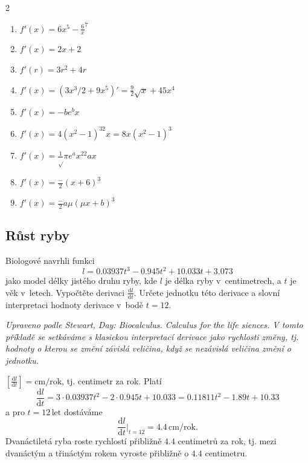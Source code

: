 \def\der#1.{$f'(x)=#1$}
\reseni
\begin{multicols}2
  \begin{enumerate}
  \item \der 6x^5-\frac{6}{x^7}.
  \item \der 2x+2.
  \item $f'(r)=3r^2+4r$
  \item \der (3x^{3/2}+9x^5)'=\frac 92\sqrt x+45x^4.
  \item \der -be^{bx}.
  \item \der 4(x^2-1)^32x=8x(x^2-1)^3.
  \item \der \frac 1{\sqrt \pi} e^{ax^2}2ax.
  \item \der \frac{-2}{(x+6)^3}.
  \item \der \frac{-2a\mu}{(\mu x+b)^3}.
  \end{enumerate}
\end{multicols}
\konec

\def\jednotka #1#2{\left[\frac{\mathrm{d}#1}{\mathrm{d}#2}\right]}
\def\derivace #1#2{\frac{\mathrm{d}#1}{\mathrm{d}#2}}


\stranka
{}
\subsection{Růst ryby}
Biologové navrhli funkci
  \begin{equation*}
    l=0.03937 t^3 - 0.945 t^2 + 10.033 t + 3.073
  \end{equation*}
  jako model délky jistého druhu ryby, kde $l$ je délka ryby v~centimetrech, a $t$ je věk v~letech.  Vypočtěte derivaci
  $\frac{\mathrm{d}l}{\mathrm {d}t}$. Určete jednotku této derivace a
  slovní interpretaci hodnoty derivace v~bodě $t=12$.

\textit{Upraveno podle Stewart, Day: Biocalculus. Calculus for the life siences. V tomto příkladě se setkáváme s klasickou interpretací derivace jako rychlosti změny, tj. hodnoty o kterou se změní závislá veličina, když se nezávislá veličina změní o jednotku.}

\reseni $\jednotka lt=\mathrm{cm}/\mathrm{rok}$, tj. centimetr za rok. Platí
  \begin{equation*}
    \derivace lt =3\cdot 0.03937 t^2 - 2\cdot 0.945 t + 10.033 =
    0.11811 t^2 -1.89 t + 10.33 
  \end{equation*}
  a pro $t=12\,\mathrm{let}$ dostáváme 
  \begin{equation*}
   \derivace lt\Bigr\vert_{t=12} =4.4\, \mathrm{cm}/\mathrm{rok}.
  \end{equation*}
  Dvanáctiletá ryba roste rychlostí přibližně $4.4$ centimetrů za rok,
tj. mezi dvanáctým a třináctým rokem vyroste přibližně o $4.4$
centimetru.

